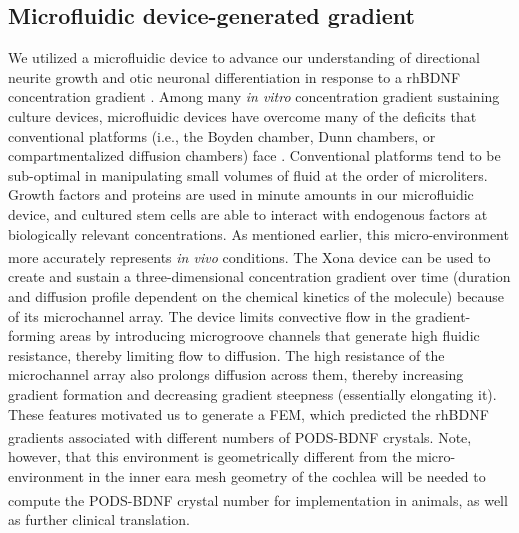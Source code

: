 \documentclass[review]{elsarticle}
\begin{document}
\subsection{Microfluidic device-generated gradient}
We utilized a microfluidic device to advance our understanding of directional neurite growth and otic neuronal differentiation in response to a rhBDNF concentration gradient \cite{dravid2020}. Among many \textit{in vitro} concentration gradient sustaining culture devices, microfluidic devices have overcome many of the deficits that conventional platforms (i.e., the Boyden chamber, Dunn chambers, or compartmentalized diffusion chambers) face \cite{dravid2020}. Conventional platforms tend to be sub-optimal in manipulating small volumes of fluid at the order of microliters. Growth factors and proteins are used in minute amounts in our microfluidic device, and cultured stem cells are able to interact with endogenous factors at biologically relevant concentrations. As mentioned earlier, this micro-environment more accurately represents \textit{in vivo} conditions. The Xona\textsuperscript{\texttrademark} device can be used to create and sustain a three-dimensional concentration gradient over time (duration and diffusion profile dependent on the chemical kinetics of the molecule) because of its microchannel array.  The device limits convective flow in the gradient-forming areas by introducing microgroove channels that generate high fluidic resistance, thereby limiting flow to diffusion. The high resistance of the microchannel array also prolongs diffusion across them, thereby increasing gradient formation and decreasing gradient steepness (essentially elongating it). These features motivated us to generate a FEM, which predicted the rhBDNF gradients associated with different numbers of PODS\textsuperscript{\textregistered}-BDNF crystals. Note, however, that this environment is geometrically different from the micro-environment in the inner ear\textendash a mesh geometry of the cochlea will be needed to compute the PODS\textsuperscript{\textregistered}-BDNF crystal number for implementation in animals, as well as further clinical translation. 
\end{document}
